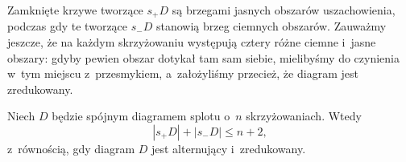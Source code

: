 Zamknięte krzywe tworzące $s_+D$ są brzegami jasnych obszarów uszachowienia, podczas gdy te tworzące $s_-D$ stanowią brzeg ciemnych obszarów.
Zauważmy jeszcze, że na każdym skrzyżowaniu występują cztery różne ciemne i~jasne obszary: gdyby pewien obszar dotykał tam sam siebie, mielibyśmy do czynienia w~tym miejscu z~przesmykiem, a~założyliśmy przecież, że diagram jest zredukowany.

\begin{lemma}
\label{lem:pretait_lemma_1}%
    Niech $D$ będzie spójnym diagramem splotu o~$n$ skrzyżowaniach.
    Wtedy
    \begin{equation}
        |s_+D| + |s_-D| \le n+2,
    \end{equation}
    z~równością, gdy diagram $D$ jest alternujący i~zredukowany.
\end{lemma}

